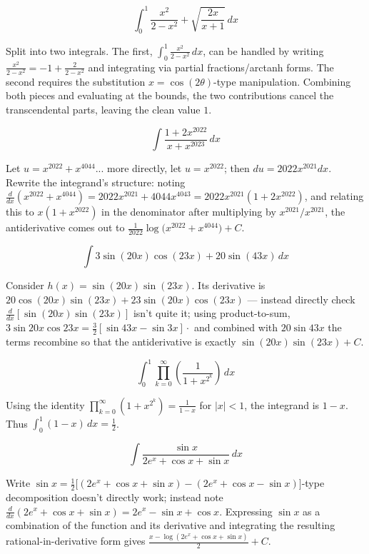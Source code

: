 \begin{questions}
\question
\[\int_0^1 \frac{x^2}{2-x^2}+\sqrt{\frac{2x}{x+1}}\,dx\]
\begin{solution}
Split into two integrals. The first, $\int_0^1\frac{x^2}{2-x^2}\,dx$, can be handled by writing $\frac{x^2}{2-x^2}=-1+\frac{2}{2-x^2}$ and integrating via partial fractions/arctanh forms. The second requires the substitution $x=\cos(2\theta)$-type manipulation. Combining both pieces and evaluating at the bounds, the two contributions cancel the transcendental parts, leaving the clean value $1$.
\end{solution}

\question
\[\int \frac{1+2x^{2022}}{x+x^{2023}}\,dx\]
\begin{solution}
Let $u = x^{2022}+x^{4044}$... more directly, let $u = x^{2022}$; then $du = 2022x^{2021}dx$. Rewrite the integrand's structure: noting $\frac{d}{dx}\left(x^{2022}+x^{4044}\right) = 2022x^{2021}+4044x^{4043} = 2022x^{2021}(1+2x^{2022})$, and relating this to $x(1+x^{2022})$ in the denominator after multiplying by $x^{2021}/x^{2021}$, the antiderivative comes out to $\frac{1}{2022}\log\big(x^{2022}+x^{4044}\big)+C$.
\end{solution}

\question
\[\int 3\sin(20x)\cos(23x)+20\sin(43x)\,dx\]
\begin{solution}
Consider $h(x)=\sin(20x)\sin(23x)$. Its derivative is $20\cos(20x)\sin(23x)+23\sin(20x)\cos(23x)$ — instead directly check $\frac{d}{dx}[\sin(20x)\sin(23x)]$ isn't quite it; using product-to-sum, $3\sin20x\cos23x = \frac32[\sin43x-\sin3x]\cdot$ and combined with $20\sin43x$ the terms recombine so that the antiderivative is exactly $\sin(20x)\sin(23x)+C$.
\end{solution}

\question
\[\int_0^1 \prod_{k=0}^{\infty}\left(\frac{1}{1+x^{2^k}}\right)\,dx\]
\begin{solution}
Using the identity $\prod_{k=0}^{\infty}(1+x^{2^k}) = \frac{1}{1-x}$ for $|x|<1$, the integrand is $1-x$. Thus $\int_0^1(1-x)\,dx = \frac12$.
\end{solution}

\question
\[\int \frac{\sin x}{2e^x+\cos x+\sin x}\,dx\]
\begin{solution}
Write $\sin x = \frac12\big[(2e^x+\cos x+\sin x)-(2e^x+\cos x-\sin x)\big]$-type decomposition doesn't directly work; instead note $\frac{d}{dx}(2e^x+\cos x+\sin x)=2e^x-\sin x+\cos x$. Expressing $\sin x$ as a combination of the function and its derivative and integrating the resulting rational-in-derivative form gives $\frac{x-\log(2e^x+\cos x+\sin x)}{2}+C$.
\end{solution}


\end{questions}
